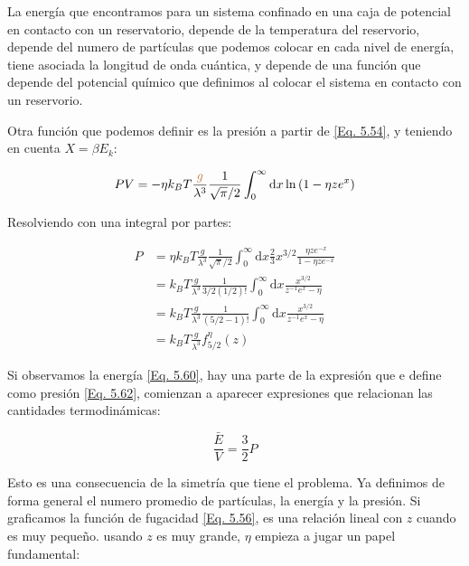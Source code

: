 \documentclass[11pt,fleqn]{book}
\begin{document}
La energía que encontramos para un sistema confinado en una caja de potencial en contacto con un reservatorio, depende de la temperatura del reservorio, depende del numero de partículas que podemos colocar en cada nivel de energía, tiene asociada la longitud de onda cuántica, y depende de una función que depende del potencial químico que definimos al colocar el sistema en contacto con un reservorio.

Otra función que podemos definir es la presión a partir de \ref{Eq. 5.54}, y teniendo en cuenta $X=\beta E_{k}$:

\begin{equation}
      PV=-\eta k_{B}T\frac{{\color{brown}g}}{\lambda^{3}}\frac{1}{\sqrt{\pi}/2}\int_{0}^{\infty}\mathrm{d}x\ln{\left(1-\eta ze^{x}\right)}
\end{equation}

Resolviendo con una integral por partes:

\begin{equation}
    \begin{split}
        P&=\eta k_{B}T\frac{g}{\lambda^{3}}\frac{1}{\sqrt{\pi}/2}\int_{0}^{\infty}\mathrm{d}x\frac{2}{3}x^{3/2}\frac{\eta ze^{-x}}{1-\eta ze^{-x}}\\
        &=k_{B}T\frac{g}{\lambda^{3}}\frac{1}{3/2(1/2)!}\int_{0}^{\infty}\mathrm{d}x\frac{x^{3/2}}{z^{-1}e^{x}-\eta}\\
        &=k_{B}T\frac{g}{\lambda^{3}}\frac{1}{(5/2-1)!}\int_{0}^{\infty}\mathrm{d}x\frac{x^{3/2}}{z^{-1}e^{x}-\eta}\\
        &=k_{B}T\frac{g}{\lambda^{3}}f_{5/2}^{\eta}(z)
    \end{split}
    \label{Eq. 5.62}
\end{equation}

Si observamos la energía \ref{Eq. 5.60}, hay una parte de la expresión que e define como presión \ref{Eq. 5.62}, comienzan a aparecer expresiones que relacionan las cantidades termodinámicas:

\begin{equation}
    \frac{\bar{E}}{V}=\frac{3}{2}P
    \label{Eq. 5.63}
\end{equation}

Esto es una consecuencia de la simetría que tiene el problema. Ya definimos de forma general el numero promedio de partículas, la energía y la presión. Si graficamos la función de fugacidad \ref{Eq. 5.56}, es una relación lineal con $z$ cuando es muy pequeño. usando $z$ es muy grande, $\eta$ empieza a jugar un papel fundamental:
\end{document}
